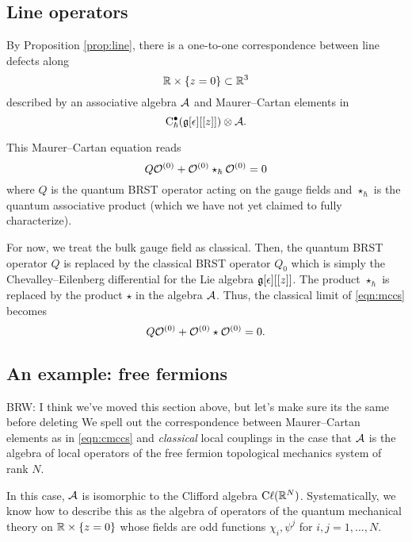 \documentclass[11pt]{amsart}
\def\brian#1{{\textcolor{blue!65!red}{BRW: {#1}}}}
\begin{document}
\subsection*{Line operators}

By Proposition \ref{prop:line}, there is a one-to-one correspondence between line defects along
\[
\mathbb R \times \{z=0\} \subset \mathbb R^3 
\]
described by an associative algebra $\mathcal A$ and Maurer--Cartan elements in 
\begin{equation}\label{eqn:criticalobs}
{\rm C}_\hbar^\bullet(\mathfrak g[\epsilon][[z]]) \otimes \mathcal A .
\end{equation}

This Maurer--Cartan equation reads
\begin{equation}\label{eqn:mccs}
Q \mathcal O^{(0)} + \mathcal O^{(0)} \star_\hbar \mathcal O^{(0)} = 0 
\end{equation}
where $Q$ is the quantum BRST operator acting on the gauge fields and $\star_\hbar$ is the quantum associative product (which we have not yet claimed to fully characterize). 

For now, we treat the bulk gauge field as classical.
Then, the quantum BRST operator $Q$ is replaced by the classical BRST operator $Q_0$ which is simply the Chevalley--Eilenberg differential for the Lie algebra $\mathfrak g[\epsilon][[z]]$.
The product $\star_\hbar$ is replaced by the product $\star$ in the algebra $\mathcal A$. 
Thus, the classical limit of \eqref{eqn:mccs} becomes
\begin{equation}\label{eqn:cmccs}
Q \mathcal O^{(0)} + \mathcal O^{(0)} \star \mathcal O^{(0)} = 0 .
\end{equation}

\subsection*{An example: free fermions}
\brian{I think we've moved this section above, but let's make sure its the same before deleting}
We spell out the correspondence between Maurer--Cartan elements as in \eqref{eqn:cmccs} and {\em classical} local couplings in the case that $\mathcal A$ is the algebra of local operators of the free fermion topological mechanics system of rank $N$. 

In this case, $\mathcal A$ is isomorphic to the Clifford algebra ${\rm C}\ell(\mathbb R^N)$. 
Systematically, we know how to describe this as the algebra of operators of the quantum mechanical theory on $\mathbb R \times \{z=0\}$ whose fields are odd functions $\chi_i, \psi^j$ for $i,j=1,\ldots, N$. 
\end{document}
